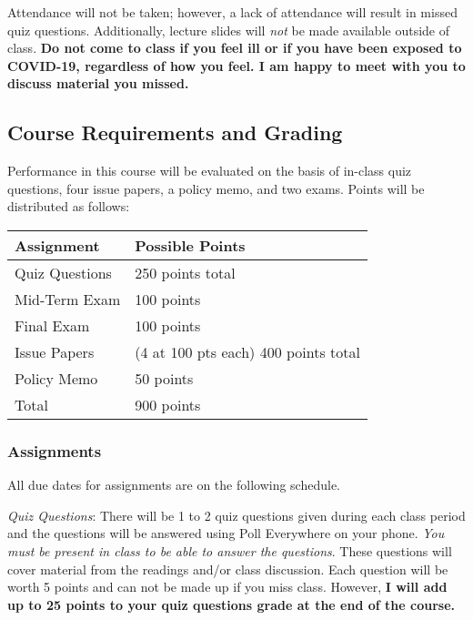 Attendance will not be taken; however, a lack of attendance will result
in missed quiz questions. Additionally, lecture slides will \emph{not}
be made available outside of class. \textbf{Do not come to class if you
feel ill or if you have been exposed to COVID-19, regardless of how you
feel. I am happy to meet with you to discuss material you missed.}

\hypertarget{course-requirements-and-grading}{%
\subsection{Course Requirements and
Grading}\label{course-requirements-and-grading}}

Performance in this course will be evaluated on the basis of in-class
quiz questions, four issue papers, a policy memo, and two exams. Points
will be distributed as follows:

\vspace{0.1in}
\begin{tabular}{ l l}
\hline
Assignment & Possible Points \\ 
\hline
Quiz Questions & 250 points total \\
Mid-Term Exam & 100 points \\ 
Final Exam & 100 points \\
Issue Papers & (4 at 100 pts each) 400 points total \\
Policy Memo & 50 points \\
\hline
Total &  900 points \\
\hline
\end{tabular}

\hypertarget{assignments}{%
\subsubsection{Assignments}\label{assignments}}

All due dates for assignments are on the following schedule.

\vspace{0.1in}

\noindent \emph{Quiz Questions}: There will be 1 to 2 quiz questions
given during each class period and the questions will be answered using
Poll Everywhere on your phone. \emph{You must be present in class to be
able to answer the questions}. These questions will cover material from
the readings and/or class discussion. Each question will be worth 5
points and can not be made up if you miss class. However, \textbf{I will
add up to 25 points to your quiz questions grade at the end of the
course.}

